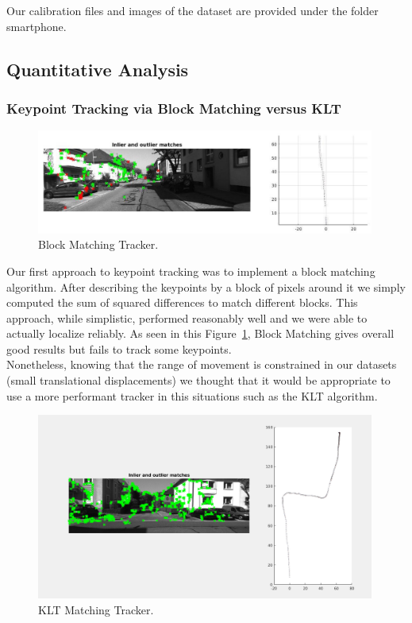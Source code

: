 Our calibration files and images of the dataset are provided under the folder smartphone.

\subsection{Quantitative Analysis}
\subsubsection{Keypoint Tracking via Block Matching versus KLT}

\begin{figure}
  \includegraphics[width=0.99\textwidth]{files/block_tracker.jpg}
  \caption[Block Matching Tracker]{\label{f:block_tracker}Block Matching Tracker.}
\end{figure}

Our first approach to keypoint tracking was to implement a block matching algorithm. After describing the keypoints by a block of pixels around it we simply computed the sum of squared differences to match different blocks. This approach, while simplistic, performed reasonably well and we were able to actually localize reliably. As seen in this Figure~\ref{f:block_tracker}, Block Matching gives overall good results but fails to track some keypoints. \\
Nonetheless, knowing that the range of movement is constrained in our datasets (small translational displacements) we thought that it would be appropriate to use a more performant tracker in this situations such as the KLT algorithm.

\begin{figure}
  \includegraphics[width=0.99\textwidth]{files/klt_tracker.png}
  \caption[KLT Matching Tracker]{\label{f:klt_tracker}KLT Matching Tracker.}
\end{figure}


